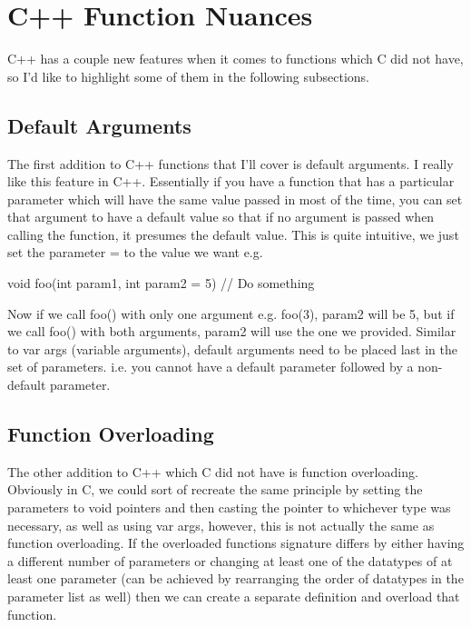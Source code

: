 \documentclass{article}
\begin{document}
\section{C++ Function Nuances}

C++ has a couple new features when it comes to functions which C did not have, so I'd like to highlight some
of them in the following subsections.

\subsection{Default Arguments}

The first addition to C++ functions that I'll cover is default arguments. I really like this feature in C++.
Essentially if you have a function that has a particular parameter which will have the same value passed in
most of the time, you can set that argument to have a default value so that if no argument is passed when
calling the function, it presumes the default value. This is quite intuitive, we just set the parameter = to
the value we want e.g.

\begin{cpplst}
void foo(int param1, int param2 = 5)
{
    // Do something
}
\end{cpplst}

Now if we call foo() with only one argument e.g. foo(3), param2 will be 5, but if we call foo() with both
arguments, param2 will use the one we provided. Similar to var args (variable arguments), default arguments
need to be placed last in the set of parameters. i.e. you cannot have a default parameter followed by a
non-default parameter.

\subsection{Function Overloading}

The other addition to C++ which C did not have is function overloading. Obviously in C, we could sort of
recreate the same principle by setting the parameters to void pointers and then casting the pointer to whichever
type was necessary, as well as using var args, however, this is not actually the same as function overloading.
If the overloaded functions signature differs by either having a different number of parameters or changing at
least one of the datatypes of at least one parameter (can be achieved by rearranging the order of datatypes in
the parameter list as well) then we can create a separate definition and overload that function.
\end{document}
